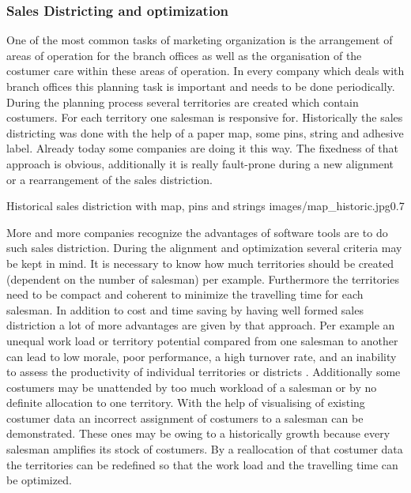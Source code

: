 \subsubsection{Sales Districting and optimization}
One of the most common tasks of marketing organization is the arrangement of areas of operation for the branch offices as well as the organisation of the costumer care within these areas of operation. In every company which deals with branch offices this planning task is important and needs to be done periodically. During the planning process several territories are created which contain costumers. For each territory one salesman is responsive for. Historically the sales districting was done with the help of a paper map, some pins, string and adhesive label. Already today some companies are doing it this way. The fixedness of that approach is obvious, additionally it is really fault-prone during a new alignment or a rearrangement of the sales distriction.

\begin{figurevarSize}{Historical sales distriction with map, pins and strings \cite{tappert}}{images/map_historic.jpg}{0.7}\end{figurevarSize} 

More and more companies recognize the advantages of software tools are to do such sales distriction. During the alignment and optimization several criteria may be kept in mind. It is necessary to know how much territories should be created (dependent on the number of salesman) per example. Furthermore the territories need to be compact and coherent to minimize the travelling time for each salesman.  In addition to cost and time saving by having well formed sales distriction a lot of more advantages are given by that approach. Per example an unequal work load or territory potential compared from one salesman to another can lead to low morale, poor performance, a high turnover rate, and an inability to assess the productivity of individual territories or districts \cite{hessstuart}. Additionally some costumers may be unattended by too much workload of a salesman or by no definite allocation to one territory. With the help of visualising of existing costumer data an incorrect assignment of costumers to a salesman can be demonstrated. These ones may be owing to a historically growth because every salesman amplifies its stock of costumers. By a reallocation of that costumer data the territories can be redefined so that the work load and the travelling time can be optimized.

